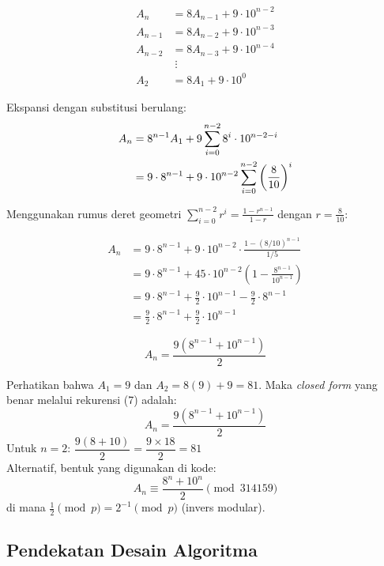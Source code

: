 \documentclass[12pt,a4paper]{article}
\theoremstyle{definition}
\begin{document}
\begin{align*}
  A_n     &= 8A_{n-1} + 9 \cdot 10^{n-2}\\
  A_{n-1} &= 8A_{n-2} + 9 \cdot 10^{n-3}\\
  A_{n-2} &= 8A_{n-3} + 9 \cdot 10^{n-4}\\
          &\;\vdots\\
  A_2     &= 8A_1 + 9 \cdot 10^0
\end{align*}

Ekspansi dengan substitusi berulang:
\begin{align}
  A_n &= 8^{n-1}A_1 + 9\sum_{i=0}^{n-2} 8^i \cdot 10^{n-2-i}\notag\\
      &= 9 \cdot 8^{n-1} + 9 \cdot 10^{n-2}\sum_{i=0}^{n-2}\left(\frac{8}{10}\right)^i
\end{align}

Menggunakan rumus deret geometri $\displaystyle\sum_{i=0}^{n-2} r^i = \frac{1-r^{n-1}}{1-r}$
dengan $r = \tfrac{8}{10}$:

\begin{align*}
  A_n &= 9 \cdot 8^{n-1} + 9 \cdot 10^{n-2} \cdot
         \frac{1-(8/10)^{n-1}}{1/5}\\
      &= 9 \cdot 8^{n-1} + 45 \cdot 10^{n-2}
         \left(1 - \frac{8^{n-1}}{10^{n-1}}\right)\\
      &= 9 \cdot 8^{n-1} + \frac{9}{2} \cdot 10^{n-1}
         - \frac{9}{2} \cdot 8^{n-1}\\
      &= \frac{9}{2}\cdot 8^{n-1} + \frac{9}{2}\cdot 10^{n-1}
\end{align*}

\begin{equation}
  \boxed{A_n = \dfrac{9\!\left(8^{n-1} + 10^{n-1}\right)}{2}}
\end{equation}

\begin{notebox}
  Perhatikan bahwa $A_1 = 9$ dan $A_2 = 8(9)+9 = 81$. Maka \emph{closed form}
  yang benar melalui rekurensi (7) adalah:
  \[
    A_n = \frac{9(8^{n-1}+10^{n-1})}{2}
  \]
  Untuk $n=2$: $\dfrac{9(8+10)}{2} = \dfrac{9\times 18}{2} = 81$ \checkmark\\[6pt]
  Alternatif, bentuk yang digunakan di kode:
  \[
    A_n \equiv \frac{8^n + 10^n}{2} \pmod{314159}
  \]
  di mana $\tfrac{1}{2} \pmod{p} = 2^{-1}\pmod{p}$ (invers modular).
\end{notebox}

\subsection{Pendekatan Desain Algoritma}
\end{document}
